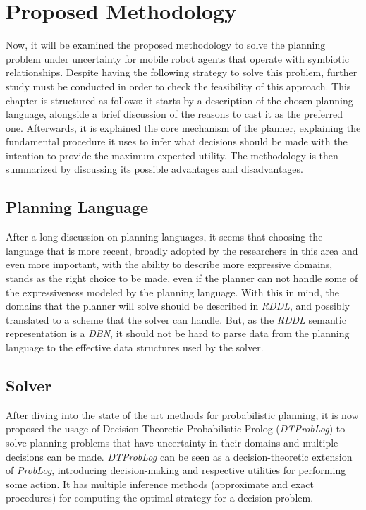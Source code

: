 
\chapter{Proposed Methodology}

Now, it will be examined the proposed methodology to solve the planning problem
under uncertainty for mobile robot agents that operate with symbiotic
relationships. Despite having the following strategy to solve this problem,
further study must be conducted in order to check the feasibility of this
approach. This chapter is structured as follows: it starts by a description of
the chosen planning language, alongside a brief discussion of the reasons to
cast it as the preferred one. Afterwards, it is explained the core mechanism of
the planner, explaining the fundamental procedure it uses to infer what
decisions should be made with the intention to provide the maximum expected
utility. The methodology is then summarized by discussing its possible
advantages and disadvantages.

\section{Planning Language}

After a long discussion on planning languages, it seems that choosing the
language that is more recent, broadly adopted by the researchers in this area
and even more important, with the ability to describe more expressive domains,
stands as the right choice to be made, even if the planner can not
handle some of the expressiveness modeled by the planning language.
With this in mind, the domains that the planner will solve should be described
in \textit{RDDL}, and possibly translated to a scheme that the solver can handle.
But, as the \textit{RDDL} semantic representation is a \textit{DBN}, it should
not be hard to parse data from the planning language to the effective data
structures used by the solver.

\section{Solver}

After diving into the state of the art methods for probabilistic planning, it is
now proposed the usage of Decision-Theoretic Probabilistic Prolog
\cite{Broeck2010} (\textit{DTProbLog}) to solve planning problems that have
uncertainty in their domains and multiple decisions can be made.
\textit{DTProbLog} can be seen as a decision-theoretic extension of
\textit{ProbLog}, introducing decision-making and respective utilities for
performing some action. It has multiple inference methods (approximate and exact
procedures) for computing the optimal strategy for a decision problem.

